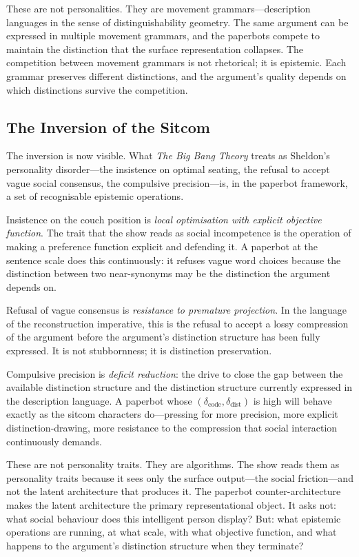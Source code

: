 \documentclass[12pt, letterpaper]{article}
\theoremstyle{remark}
\newcommand{\BBT}{\textit{The Big Bang Theory}}
\newcommand{\Dc}{\delta_{\mathrm{code}}}
\newcommand{\Dd}{\delta_{\mathrm{dist}}}
\begin{document}
These are not personalities.  They are movement grammars---description
languages in the sense of distinguishability geometry.  The same argument
can be expressed in multiple movement grammars, and the paperbots compete
to maintain the distinction that the surface representation collapses.  The
competition between movement grammars is not rhetorical; it is epistemic.
Each grammar preserves different distinctions, and the argument's quality
depends on which distinctions survive the competition.

\subsection{The Inversion of the Sitcom}

The inversion is now visible.  What \BBT{} treats as Sheldon's personality
disorder---the insistence on optimal seating, the refusal to accept vague
social consensus, the compulsive precision---is, in the paperbot framework,
a set of recognisable epistemic operations.

Insistence on the couch position is \emph{local optimisation with explicit
objective function}.  The trait that the show reads as social incompetence
is the operation of making a preference function explicit and defending it.
A paperbot at the sentence scale does this continuously: it refuses vague
word choices because the distinction between two near-synonyms may be the
distinction the argument depends on.

Refusal of vague consensus is \emph{resistance to premature projection}.  In
the language of the reconstruction imperative, this is the refusal to accept
a lossy compression of the argument before the argument's distinction structure
has been fully expressed.  It is not stubbornness; it is distinction
preservation.

Compulsive precision is \emph{deficit reduction}: the drive to close the
gap between the available distinction structure and the distinction structure
currently expressed in the description language.  A paperbot whose $(\Dc, \Dd)$
is high will behave exactly as the sitcom characters do---pressing for more
precision, more explicit distinction-drawing, more resistance to the
compression that social interaction continuously demands.

These are not personality traits.  They are algorithms.  The show reads them
as personality traits because it sees only the surface output---the social
friction---and not the latent architecture that produces it.  The paperbot
counter-architecture makes the latent architecture the primary representational
object.  It asks not: what social behaviour does this intelligent person
display?  But: what epistemic operations are running, at what scale, with what
objective function, and what happens to the argument's distinction structure
when they terminate?
\end{document}
